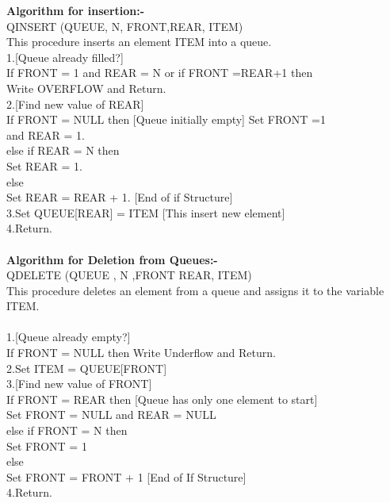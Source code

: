 \documentclass[11pt]{article}            %
\newcommand\tab[1][1cm]{\hspace*{#1}}
\begin{document}
\textbf{Algorithm for insertion:-}\\
QINSERT (QUEUE, N, FRONT,REAR, ITEM)\\
This procedure inserts an element ITEM into a queue.\\
\tab	1.[Queue already filled?]\\
If FRONT = 1 and REAR = N or if FRONT =REAR+1 then\\
Write OVERFLOW and Return.\\
\tab	2.[Find new value of REAR]\\
If FRONT = NULL then [Queue initially empty] Set FRONT =1\\
and REAR = 1.\\
\tab 	else if REAR = N then\\
Set REAR = 1.\\
else\\
Set REAR = REAR + 1. [End of if Structure]\\
3.Set QUEUE[REAR] = ITEM [This insert new element]\\
4.Return.\\~\\

\textbf{Algorithm for Deletion from Queues:-}\\
QDELETE (QUEUE , N ,FRONT REAR, ITEM)\\
This procedure deletes an element from a queue and assigns it to the variable ITEM.\\~\\
1.[Queue already empty?]\\
If FRONT = NULL then Write Underflow and Return.\\
2.Set ITEM = QUEUE[FRONT]\\
3.[Find new value of FRONT]\\
If FRONT = REAR then [Queue has only one element to start]\\
Set FRONT = NULL and REAR = NULL\\
\tab else if FRONT = N then\\
Set FRONT = 1\\
else\\
\tab Set FRONT = FRONT + 1 [End of If Structure]\\
4.Return.\\~\\
\end{document}
